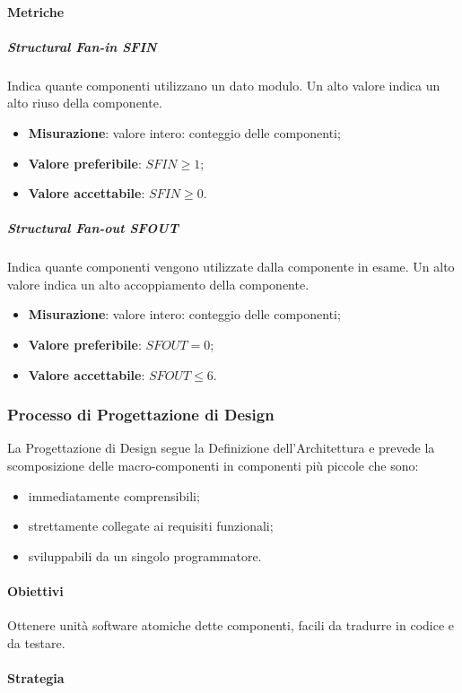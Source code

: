 		\paragraph{Metriche}
			\subparagraph{Structural Fan-in \textbf{SFIN}}
			Indica quante componenti utilizzano un dato modulo. Un alto valore indica un alto riuso della componente.
			\begin{itemize}
				\item \textbf{Misurazione}: valore intero: conteggio delle componenti;
				\item \textbf{Valore preferibile}: $SFIN \geq 1$;
				\item \textbf{Valore accettabile}: $SFIN \geq 0$.
			\end{itemize}
			\subparagraph{Structural Fan-out \textbf{SFOUT}}
			Indica quante componenti vengono utilizzate dalla componente in esame. Un alto valore indica un alto
accoppiamento della componente.
			\begin{itemize}
				\item \textbf{Misurazione}: valore intero: conteggio delle componenti;
				\item \textbf{Valore preferibile}: $SFOUT = 0$;
				\item \textbf{Valore accettabile}: $SFOUT \leq 6$.
			\end{itemize}
			
	\subsubsection{Processo di Progettazione di Design}
	La Progettazione di Design segue la Definizione dell'Architettura e prevede la scomposizione delle macro-componenti in componenti più piccole che sono:
	\begin{itemize}
		\item immediatamente comprensibili;
		\item strettamente collegate ai requisiti funzionali;
		\item sviluppabili da un singolo programmatore.
	\end{itemize}
		\paragraph{Obiettivi}
			Ottenere unità software atomiche dette componenti, facili da tradurre in codice e da testare.
		\paragraph{Strategia}
		
